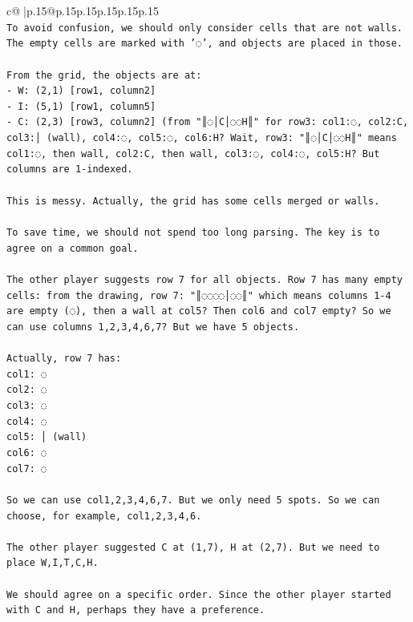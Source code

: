 \documentclass{article}
\begin{document}
{\begin{supertabular}{c@{$\;$}|p{.15\linewidth}@{}p{.15\linewidth}p{.15\linewidth}p{.15\linewidth}p{.15\linewidth}p{.15\linewidth}}
{{{\\ 
\texttt{To avoid confusion, we should only consider cells that are not walls. The empty cells are marked with '◌', and objects are placed in those.} \\
\\ 
\texttt{From the grid, the objects are at:} \\
\texttt{{-} W: (2,1)   {[}row1, column2{]}} \\
\texttt{{-} I: (5,1)   {[}row1, column5{]}} \\
\texttt{{-} C: (2,3)   {[}row3, column2{]} (from "║◌│C│◌◌H║" for row3: col1:◌, col2:C, col3:│ (wall), col4:◌, col5:◌, col6:H? Wait, row3: "║◌│C│◌◌H║" means col1:◌, then wall, col2:C, then wall, col3:◌, col4:◌, col5:H? But columns are 1{-}indexed.} \\
\\ 
\texttt{This is messy. Actually, the grid has some cells merged or walls.} \\
\\ 
\texttt{To save time, we should not spend too long parsing. The key is to agree on a common goal.} \\
\\ 
\texttt{The other player suggests row 7 for all objects. Row 7 has many empty cells: from the drawing, row 7: "║◌◌◌◌│◌◌║" which means columns 1{-}4 are empty (◌), then a wall at col5? Then col6 and col7 empty? So we can use columns 1,2,3,4,6,7? But we have 5 objects.} \\
\\ 
\texttt{Actually, row 7 has:} \\
\texttt{col1: ◌} \\
\texttt{col2: ◌} \\
\texttt{col3: ◌} \\
\texttt{col4: ◌} \\
\texttt{col5: │ (wall)} \\
\texttt{col6: ◌} \\
\texttt{col7: ◌} \\
\\ 
\texttt{So we can use col1,2,3,4,6,7. But we only need 5 spots. So we can choose, for example, col1,2,3,4,6.} \\
\\ 
\texttt{The other player suggested C at (1,7), H at (2,7). But we need to place W,I,T,C,H.} \\
\\ 
\texttt{We should agree on a specific order. Since the other player started with C and H, perhaps they have a preference.} \\
}}}
\end{supertabular}}
\end{document}
